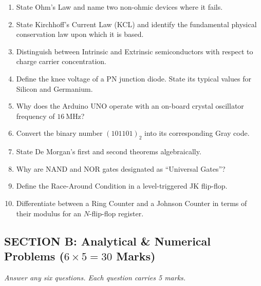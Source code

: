 \begin{enumerate}[label=\textbf{Q\arabic*.}, leftmargin=2em]
    \item State Ohm's Law and name two non-ohmic devices where it fails.
    \item State Kirchhoff's Current Law (KCL) and identify the fundamental physical conservation law upon which it is based.
    \item Distinguish between Intrinsic and Extrinsic semiconductors with respect to charge carrier concentration.
    \item Define the knee voltage of a PN junction diode. State its typical values for Silicon and Germanium.
    \item Why does the Arduino UNO operate with an on-board crystal oscillator frequency of $\SI{16}{\mega\hertz}$?
    \item Convert the binary number $(101101)_2$ into its corresponding Gray code.
    \item State De Morgan's first and second theorems algebraically.
    \item Why are NAND and NOR gates designated as ``Universal Gates''?
    \item Define the Race-Around Condition in a level-triggered JK flip-flop.
    \item Differentiate between a Ring Counter and a Johnson Counter in terms of their modulus for an $N$-flip-flop register.
\end{enumerate}

\subsection*{SECTION B: Analytical \& Numerical Problems ($6 \times 5 = 30$ Marks)}
\noindent\textit{Answer any six questions. Each question carries 5 marks.}

